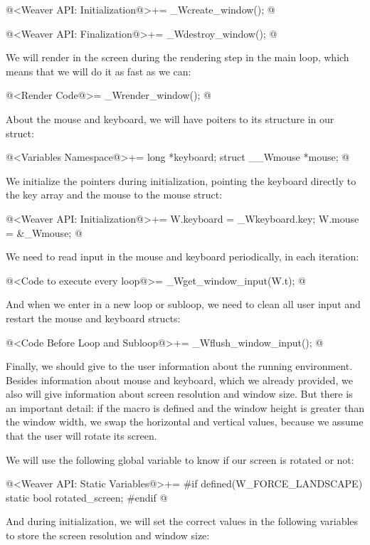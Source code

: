\iniciocodigo
@<Weaver API: Initialization@>+=
_Wcreate_window();
@
\fimcodigo

\iniciocodigo
@<Weaver API: Finalization@>+=
_Wdestroy_window();
@
\fimcodigo

We will render in the screen during the rendering step in the main
loop, which means that we will do it as fast as we can:

\iniciocodigo
@<Render Code@>=
_Wrender_window();
@
\fimcodigo

About the mouse and keyboard, we will have poiters to its structure in
our  struct:

\iniciocodigo
@<Variables Namespace@>+=
long *keyboard;
struct __Wmouse *mouse;
@
\fimcodigo

We initialize the pointers during initialization, pointing the
keyboard directly to the key array and the mouse to the mouse struct:

\iniciocodigo
@<Weaver API: Initialization@>+=
W.keyboard = _Wkeyboard.key;
W.mouse = &_Wmouse;
@
\fimcodigo

We need to read input in the mouse and keyboard periodically, in each
iteration:

\iniciocodigo
@<Code to execute every loop@>=
_Wget_window_input(W.t);
@
\fimcodigo

And when we enter in a new loop or subloop, we need to clean all user
input and restart the mouse and keyboard structs:

\iniciocodigo
@<Code Before Loop and Subloop@>+=
_Wflush_window_input();
@
\fimcodigo

Finally, we should give to the user information about the running
environment. Besides information about mouse and keyboard, which we
already provided, we also will give information about screen
resolution and window size. But there is an important detail: if the
macro  is defined and the window
height is greater than the window width, we swap the horizontal and
vertical values, because we assume that the user will rotate its
screen.

We will use the following global variable to know if our screen is
rotated or not:

\iniciocodigo
@<Weaver API: Static Variables@>+=
#if defined(W_FORCE_LANDSCAPE)
static bool rotated_screen;
#endif
@
\fimcodigo

And during initialization, we will set the correct values in the
following variables to store the screen resolution and window size:


